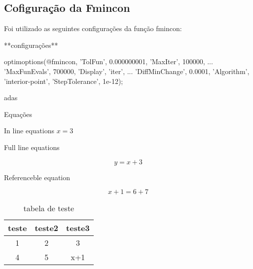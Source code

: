 
    
    
    
    
    
    
    
    
    


\subsection{Cofiguração da Fmincon}
Foi utilizado as seguintes configurações da função fmincon:

**configurações**

optimoptions(@fmincon, 'TolFun', 0.000000001, 'MaxIter', 100000, ...
                       'MaxFunEvals', 700000, 'Display', 'iter', ...
                       'DiffMinChange', 0.0001, 'Algorithm', 'interior-point', 'StepTolerance', 1e-12);

adas


Equações

In line equations $x = 3$

Full line equations

$$y = x+3$$

Referenceble equation

\begin{equation}
\label{eq:teste}
x+1 = 6+7
\end{equation}

\begin{table}
    \begin{center}
    \caption{tabela de teste}
    \label{tab:teste}
    \begin{tabular}{c c c}
        teste & teste2 & teste3 \\ \hline
        1 & 2 & 3 \\
        4 & 5 & x+1 \\ \hline
    \end{tabular}
    \end{center}
\end{table}
                       
